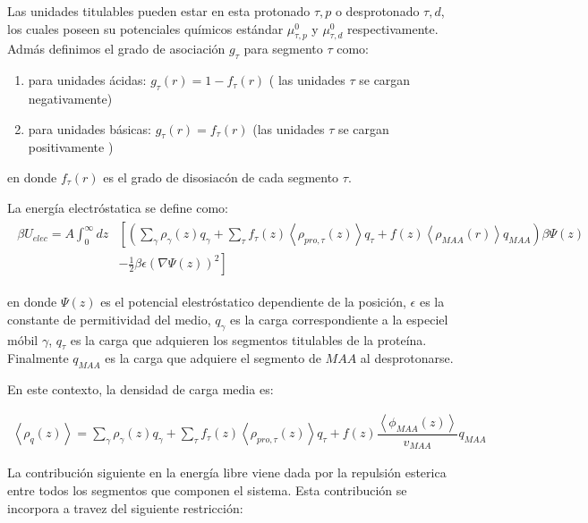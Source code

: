 Las unidades titulables pueden estar en esta protonado $\tau, p$ o desprotonado $\tau, d$, los cuales poseen su potenciales qu\'imicos est\'andar $\mu^0_{\tau,p}$ y $\mu^0_{\tau,d}$ respectivamente. 
Adm\'as definimos el grado de asociaci\'on $g_\tau$ para segmento $\tau$ como:


\begin{enumerate}
	\item para unidades \'acidas: $g_\tau(r) = 1-f_\tau(r)$ ( las unidades $\tau$ se cargan negativamente)
	\item para unidades b\'asicas: $g_\tau(r) = f_\tau(r)$ (las  unidades $\tau$ se cargan positivamente  )
\end{enumerate}
en donde  $f_\tau(r)$ es el grado de disosiac\'on de cada segmento $\tau$.

La energ\'ia electr\'ostatica se define como:
\begin{align}
	\begin{aligned}
		\beta U_{elec}= A\int_0^\infty dz&\left[\left(\sum_{\gamma } {\rho_\gamma(z) q_\gamma + \sum_\tau{f_\tau(z) \left<\rho_{pro,\tau}(z)\right> q_\tau} +  f(z)\left<\rho_{MAA}(r)\right>q_{MAA}}\right)\beta\Psi(z) \right. \\ &\left.-\frac{1}{2}\beta\epsilon(\nabla\Psi(z))^2 \right]
	\end{aligned}
\end{align} 

\noindent en donde $\Psi(z)$ es el potencial elestr\'ostatico dependiente de la posici\'on, $\epsilon$ es la constante de permitividad del medio, $q_\gamma$ es la carga correspondiente a la especiel m\'obil $\gamma$, $q_\tau$ es la carga que adquieren los segmentos titulables de la prote\'ina. Finalmente $q_{MAA}$ es la carga que adquiere el segmento de $MAA$ al desprotonarse.


En este contexto, la densidad de carga media es:

\begin{align}
	\left<\rho_q(z)\right> = \sum_{\gamma } {\rho_\gamma(z) q_\gamma + \sum_\tau{f_\tau(z) \left<\rho_{pro,\tau}(z)\right> q_\tau} +  f(z)\dfrac{\left<\phi_{MAA}(z)\right>}{v_{MAA}}q_{MAA}}
	\label{eq:rho_charge}
\end{align}

La contribuci\'on siguiente en la energ\'ia libre viene dada por la repulsi\'on esterica entre  todos los segmentos que componen  el sistema. Esta contribuci\'on se incorpora a travez del siguiente restricci\'on:  

